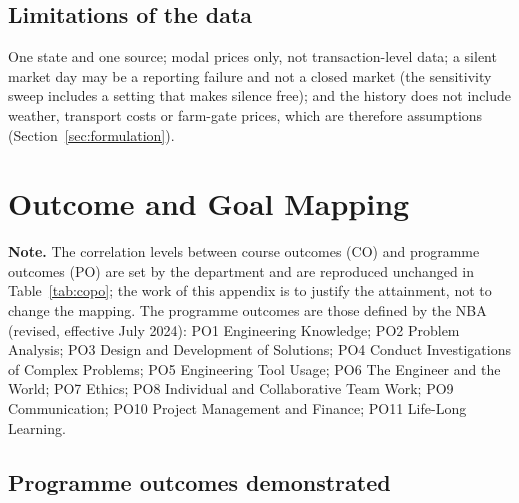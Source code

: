 \section{Limitations of the data}
One state and one source; modal prices only, not transaction-level data; a silent market day may be a reporting failure and not a closed market (the sensitivity sweep includes a setting that makes silence free); and the history does not include weather, transport costs or farm-gate prices, which are therefore assumptions (Section~\ref{sec:formulation}).

\chapter{Outcome and Goal Mapping}
\label{appendix:mapping}

\noindent\textbf{Note.} The correlation levels between course outcomes (CO) and programme outcomes (PO) are set by the department and are reproduced unchanged in Table~\ref{tab:copo}; the work of this appendix is to justify the attainment, not to change the mapping. The programme outcomes are those defined by the NBA (revised, effective July 2024): PO1 Engineering Knowledge; PO2 Problem Analysis; PO3 Design and Development of Solutions; PO4 Conduct Investigations of Complex Problems; PO5 Engineering Tool Usage; PO6 The Engineer and the World; PO7 Ethics; PO8 Individual and Collaborative Team Work; PO9 Communication; PO10 Project Management and Finance; PO11 Life-Long Learning.

\section{Programme outcomes demonstrated}

